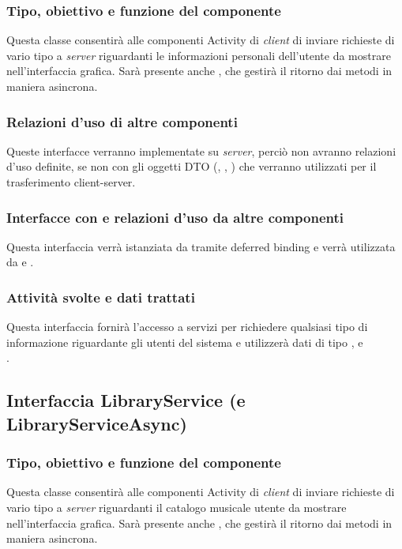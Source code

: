 \subsubsection*{Tipo, obiettivo e funzione del componente}
Questa classe consentir\`a alle componenti Activity di \emph{client} di inviare
richieste di vario tipo a \emph{server} riguardanti le informazioni personali
dell'utente da mostrare  nell'interfaccia grafica. Sar\`a presente anche
, che gestir\`a il ritorno dai metodi in maniera asincrona.

\subsubsection*{Relazioni d'uso di altre componenti}
Queste interfacce verranno implementate su \emph{server}, perci\`o non
avranno relazioni d'uso definite, se non con gli oggetti DTO (,
, ) che verranno utilizzati per il
trasferimento client-server.

\subsubsection*{Interfacce con e relazioni d'uso da altre componenti}
Questa interfaccia verr\`a istanziata da  tramite deferred
binding e verr\`a utilizzata da  e .

\subsubsection*{Attivit\`a svolte e dati trattati}
Questa interfaccia fornir\`a l'accesso a servizi per richiedere qualsiasi tipo
di informazione riguardante gli utenti del sistema e utilizzer\`a dati di tipo
,  e\\.

\subsection{Interfaccia LibraryService (e LibraryServiceAsync)}
\subsubsection*{Tipo, obiettivo e funzione del componente}
Questa classe consentir\`a alle componenti Activity di \emph{client} di inviare
richieste di vario tipo a \emph{server} riguardanti il catalogo musicale utente
da mostrare nell'interfaccia grafica. Sar\`a presente anche
, che gestir\`a il ritorno dai metodi in maniera
asincrona.

